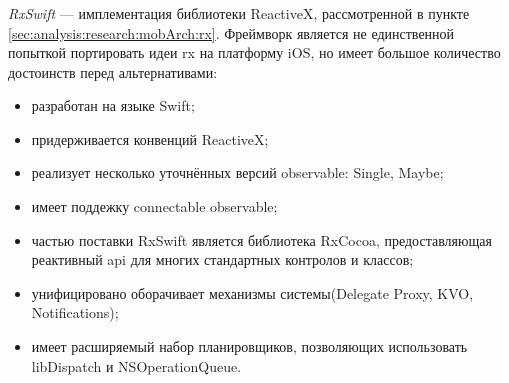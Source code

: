 \subsubsection{}
\label{sec:development:arch:ios:rxswift}

\emph{RxSwift} --- имплементация библиотеки ReactiveX, рассмотренной в пункте \ref{sec:analysis:research:mobArch:rx}. Фреймворк является не единственной попыткой портировать идеи \gls{rx} на платформу iOS, но имеет большое количество достоинств перед альтернативами:

\begin{itemize}
	\item разработан на языке Swift;
	\item придерживается конвенций ReactiveX;
	\item реализует несколько уточнённых версий \gls{observable}: Single, Maybe;
	\item имеет поддежку connectable \gls{observable};
	\item частью поставки RxSwift является библиотека RxCocoa, предоставляющая реактивный \gls{api} для многих стандартных контролов и классов;
	\item унифицировано оборачивает механизмы системы(Delegate Proxy, KVO, Notifications);
	\item имеет расширяемый набор планировщиков, позволяющих использовать libDispatch и NSOperationQueue.
\end{itemize}
